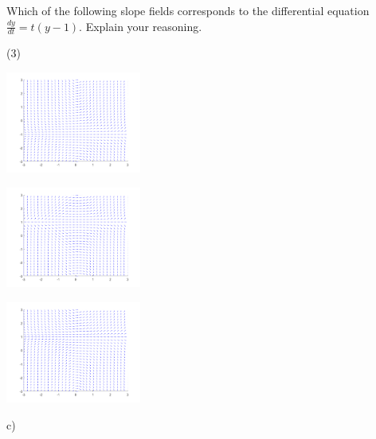 \begin{exercise}
Which of the following slope fields corresponds to the differential equation $\frac{dy}{dt} = t(y-1)$. Explain your reasoning.
\begin{tasks}(3)
\task
\parbox[c]{1.75in}{\includegraphics[width=1.75in]{Images/yprimetyp1slope}}
\task
\parbox[c]{1.75in}{\includegraphics[width=1.75in]{Images/yprimetsqym1slope}}
\task
\parbox[c]{1.75in}{\includegraphics[width=1.75in]{Images/yprimetym1slope}}
\end{tasks}
\end{exercise}
\comboSol{%
}
{%
c)
}

